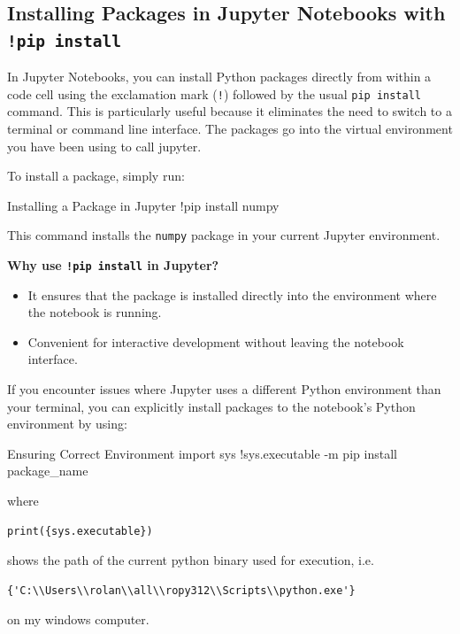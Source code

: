%
\subsection{Installing Packages in Jupyter Notebooks with \texttt{!pip install}}

In Jupyter Notebooks, you can install Python packages directly from within a code cell using the exclamation mark (\texttt{!}) followed by the usual \texttt{pip install} command. This is particularly useful because it eliminates the need to switch to a terminal or command line interface. The packages go into the virtual environment you have been using to call jupyter. 

To install a package, simply run:

\begin{codeonly}{Installing a Package in Jupyter}
!pip install numpy
\end{codeonly}

This command installs the \texttt{numpy} package in your current Jupyter environment.

\textbf{Why use \texttt{!pip install} in Jupyter?}
\begin{itemize}
    \item It ensures that the package is installed directly into the environment where the notebook is running.
    \item Convenient for interactive development without leaving the notebook interface.
\end{itemize}

If you encounter issues where Jupyter uses a different Python environment than your terminal, you can explicitly install packages to the notebook's Python environment by using:

\begin{codeonly}{Ensuring Correct Environment}
import sys
!{sys.executable} -m pip install package_name
\end{codeonly}

where
\begin{lstlisting}
print({sys.executable})
\end{lstlisting}
shows the path of the current python binary used for execution, i.e.

\begin{lstlisting}
{'C:\\Users\\rolan\\all\\ropy312\\Scripts\\python.exe'}
\end{lstlisting}
on my windows computer. 

